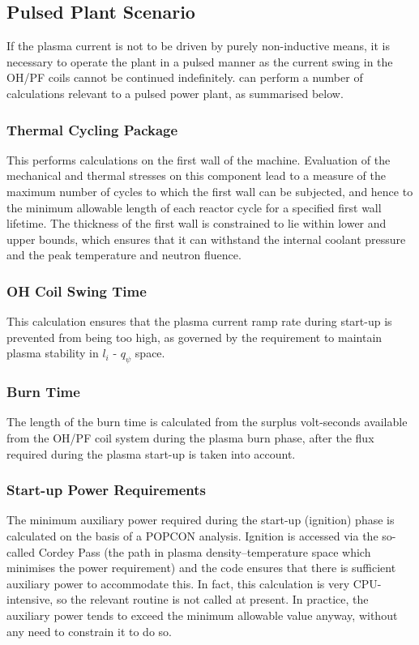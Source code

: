 \subsection{Pulsed Plant Scenario}

If the plasma current is not to be driven by purely non-inductive means, it is
necessary to operate the plant in a pulsed manner as the current swing in the
OH/PF coils cannot be continued indefinitely. \PS can perform a number of
calculations relevant to a pulsed power plant, as summarised below.

\subsubsection{Thermal Cycling Package}
This performs calculations on the first wall of the machine. Evaluation of the
mechanical and thermal stresses on this component lead to a measure of the
maximum number of cycles to which the first wall can be subjected, and hence
to the minimum allowable length of each reactor cycle for a specified first
wall lifetime. The thickness of the first wall is constrained to lie within
lower and upper bounds, which ensures that it can withstand the internal
coolant pressure and the peak temperature and neutron fluence.

\subsubsection{OH Coil Swing Time}
This calculation ensures that the plasma current ramp rate during start-up is
prevented from being too high, as governed by the requirement to maintain
plasma stability in $l_i$ - $q_\psi$ space.

\subsubsection{Burn Time}
The length of the burn time is calculated from the surplus volt-seconds
available from the OH/PF coil system during the plasma burn phase, after the
flux required during the plasma start-up is taken into account.

\subsubsection{Start-up Power Requirements}
The minimum auxiliary power required during the start-up (ignition) phase is
calculated on the basis of a POPCON analysis. Ignition is accessed via the
so-called Cordey Pass (the path in plasma density--temperature space which
minimises the power requirement) and the code ensures that there is sufficient
auxiliary power to accommodate this. In fact, this calculation is very
CPU-intensive, so the relevant routine is not called at present. In practice,
the auxiliary power tends to exceed the minimum allowable value anyway,
without any need to constrain it to do so.

